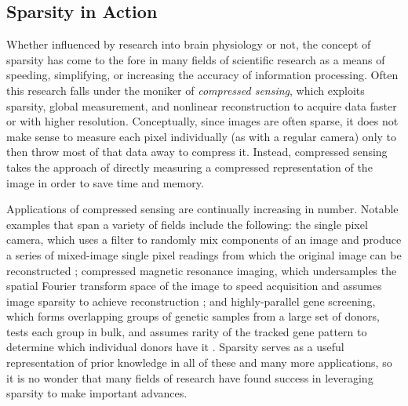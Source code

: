 \subsection{Sparsity in Action}
\label{intro_sparsity_research}
Whether influenced by research into brain physiology or not, the concept of sparsity has come to the fore in many fields of scientific research as a means of speeding, simplifying, or increasing the accuracy of information processing. Often this research falls under the moniker of \emph{compressed sensing}, which exploits sparsity, global measurement, and nonlinear reconstruction to acquire data faster or with higher resolution. Conceptually, since images are often sparse, it does not make sense to measure each pixel individually (as with a regular camera) only to then throw most of that data away to compress it. Instead, compressed sensing takes the approach of directly measuring a compressed representation of the image in order to save time and memory.

Applications of compressed sensing are continually increasing in number. Notable examples that span a variety of fields include the following: the single pixel camera, which uses a filter to randomly mix components of an image and produce a series of mixed-image single pixel readings from which the original image can be reconstructed \autocite{DDT+08}; compressed magnetic resonance imaging, which undersamples the spatial Fourier transform space of the image to speed acquisition and assumes image sparsity to achieve reconstruction \autocite{LDSP08}; and highly-parallel gene screening, which forms overlapping groups of genetic samples from a large set of donors, tests each group in bulk, and assumes rarity of the tracked gene pattern to determine which individual donors have it \autocite{EGB+10, GER12}. Sparsity serves as a useful representation of prior knowledge in all of these and many more applications, so it is no wonder that many fields of research have found success in leveraging sparsity to make important advances.

